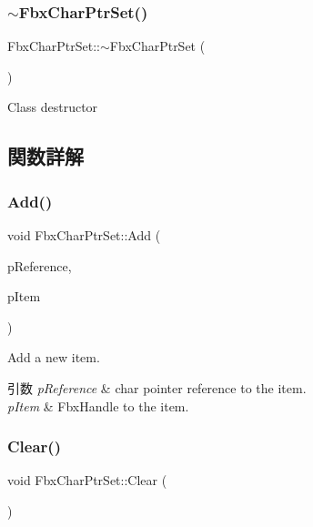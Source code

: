 \subsubsection{\texorpdfstring{$\sim$\+Fbx\+Char\+Ptr\+Set()}{~FbxCharPtrSet()}}
{\footnotesize\ttfamily Fbx\+Char\+Ptr\+Set\+::$\sim$\+Fbx\+Char\+Ptr\+Set (\begin{DoxyParamCaption}{ }\end{DoxyParamCaption})}



Class destructor 



\subsection{関数詳解}
\mbox{\label{class_fbx_char_ptr_set_a9efd684cdc4dbb93168c91fb717e89b1}} 
\subsubsection{\texorpdfstring{Add()}{Add()}}
{\footnotesize\ttfamily void Fbx\+Char\+Ptr\+Set\+::\+Add (\begin{DoxyParamCaption}\item[{const char $\ast$}]{p\+Reference,  }\item[{Fbx\+Handle}]{p\+Item }\end{DoxyParamCaption})}

Add a new item. 
\begin{DoxyParams}{引数}
{\em p\+Reference} & char pointer reference to the item. \\
\hline
{\em p\+Item} & Fbx\+Handle to the item. \\
\hline
\end{DoxyParams}
\mbox{\label{class_fbx_char_ptr_set_a868b8f961a3e3f5d4c4c5f77009e5947}} 
\subsubsection{\texorpdfstring{Clear()}{Clear()}}
{\footnotesize\ttfamily void Fbx\+Char\+Ptr\+Set\+::\+Clear (\begin{DoxyParamCaption}{ }\end{DoxyParamCaption})}




